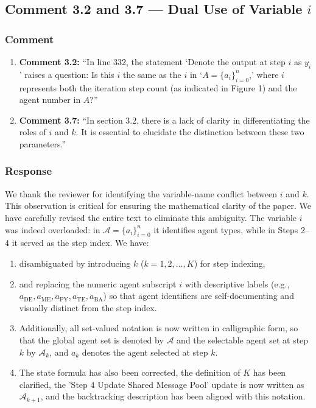 \documentclass[11pt,a4paper]{article}
\begin{document}
\subsection{Comment 3.2 and 3.7 --- Dual Use of Variable $i$}

\subsubsection{Comment}
\begin{enumerate}
\item \textbf{Comment 3.2: } ``In line 332, the statement `Denote the output at step $i$ as $y_i$' raises a question: Is this $i$ the same as the $i$ in `$A = \{a_i\}^n_{i=0}$,' where $i$ represents both the iteration step count (as indicated in Figure 1) and the agent number in $A$?''
\item \textbf{Comment 3.7: } ``In section 3.2, there is a lack of clarity in differentiating the roles of $i$ and $k$. It is essential to elucidate the distinction between these two parameters.''
\end{enumerate}

\subsubsection{Response}
We thank the reviewer for identifying the variable-name conflict between $i$ and $k$. This observation is critical for ensuring the mathematical clarity of the paper. We have carefully revised the entire text to eliminate this ambiguity. The variable $i$ was indeed overloaded: in $\mathcal{A}=\{a_i\}_{i=0}^n$ it identifies agent types, while in Steps 2--4 it served as the step index. We have:
\begin{enumerate}
\item disambiguated by introducing $k$ ($k=1,2,\ldots,K$) for step indexing, 
\item and replacing the numeric agent subscript $i$ with descriptive labels (e.g., $a_{\text{DE}}, a_{\text{ME}}, a_{\text{PY}}, a_{\text{TE}}, a_{\text{BA}}$) so that agent identifiers are self-documenting and visually distinct from the step index. 
\item  Additionally, all set-valued notation is now written in calligraphic form, so that the global agent set is denoted by $\mathcal{A}$ and the selectable agent set at step $k$ by $\mathcal{A}_k$, and $a_k$ denotes the agent selected at step $k$. 
\item  The state formula has also been corrected, the definition of $K$ has been clarified, the 'Step 4 Update Shared Message Pool' update is now written as $\mathcal{A}_{k+1}$, and the backtracking description has been aligned with this notation.
\end{enumerate}
\end{document}
